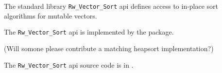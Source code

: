 
The standard library {\tt Rw\_Vector\_Sort} api defines access to in-place sort algorithms for 
mutable vectors.

The {\tt Rw\_Vector\_Sort} api is implemented by the  package.

(Will somone please contribute a matching heapsort implementation?)

The {\tt Rw\_Vector\_Sort} api source code is in .

